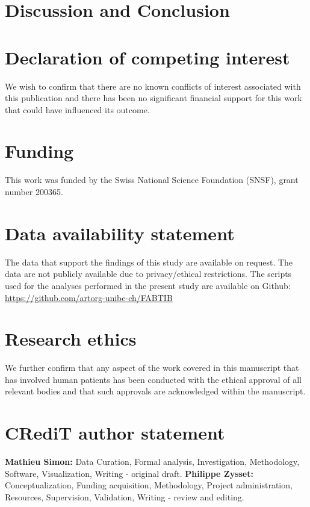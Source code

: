 \documentclass[a4paper,fleqn]{DC_ArtStyle}
\begin{document}
	\clearpage
	\section{Discussion and Conclusion}
	
	
	\section*{Declaration of competing interest}
	We wish to confirm that there are no known conflicts of interest associated with this publication and there has been no significant financial support for this work that could have influenced its outcome.
	
	\section*{Funding}
	This work was funded by the Swiss National Science Foundation (SNSF), grant number 200365.

	\section*{Data availability statement}
	The data that support the findings of this study are available on request. The data are not publicly available due to privacy/ethical restrictions. The scripts used for the analyses performed in the present study are available on Github: \url{https://github.com/artorg-unibe-ch/FABTIB}
	
	\section*{Research ethics}
	We further confirm that any aspect of the work covered in this manuscript that has involved human patients has been conducted with the ethical approval of all relevant bodies and that such approvals are acknowledged within the manuscript.
	
	\section*{CRediT author statement}
	\textbf{Mathieu Simon:} Data Curation, Formal analysis, Investigation, Methodology, Software, Visualization, Writing - original draft.
	\textbf{Philippe Zysset:} Conceptualization, Funding acquisition, Methodology, Project administration, Resources, Supervision, Validation, Writing - review and editing.
	
\end{document}

